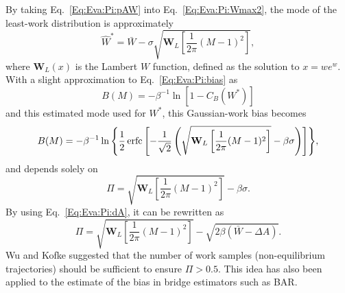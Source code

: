 By taking Eq.~\ref{Eq:Eva:Pi:pAW} into Eq.~\ref{Eq:Eva:Pi:Wmax2}, the mode of the least-work distribution is approximately
\begin{equation}
    \hat{W}^\ast=\bar{W}-\sigma\sqrt{\mathbf{W}_L\left[\frac{1}{2\pi}(M-1)^2\right]},
\end{equation}
where $\mathbf{W}_L(x)$ is the Lambert $W$ function, defined as the solution to $x=we^w$. With a slight approximation to Eq.~\ref{Eq:Eva:Pi:bias} as
\begin{equation}
    B(M)=-\beta^{-1}\ln{[1-C_B(W^\ast)]}
\end{equation}
and this estimated mode used for $W^\ast$, this Gaussian-work bias becomes
\begin{equation}
    B(M)=-\beta^{-1}\ln{\left\{\frac{1}{2}\operatorname{erfc}\left[-\frac{1}{\sqrt{2}}\left(\sqrt{\mathbf{W}_L\left[\frac{1}{2\pi}(M-1)^2\right]}-\beta\sigma\right)\right]\right\}},
\end{equation}
and depends solely on
\begin{equation}
    \Pi=\sqrt{\mathbf{W}_L\left[\frac{1}{2\pi}(M-1)^2\right]}-\beta\sigma.
\end{equation}
By using Eq.~\ref{Eq:Eva:Pi:dA}, it can be rewritten as
\begin{equation}
\Pi=\sqrt{\mathbf{W}_L\left[\frac{1}{2\pi}(M-1)^2\right]}-\sqrt{2\beta(\bar{W}-\Delta A)}.
\end{equation}
Wu and Kofke suggested that the number of work samples (non-equilibrium trajectories) should be sufficient to ensure $\Pi>0.5$.\cite{WuJCP2004} This idea has also been applied to the estimate of the bias in bridge estimators such as BAR.\cite{RadakJCP2019}

